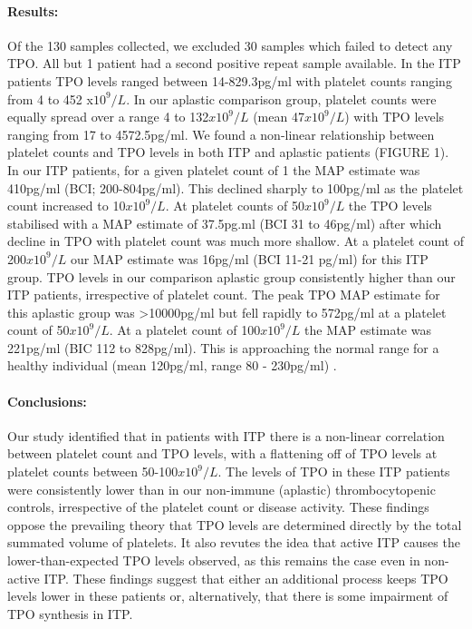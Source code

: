 \documentclass[11pt]{article}
\begin{document}
\paragraph{Results:} Of the 130 samples collected, we excluded 30 samples which failed to detect any TPO. All but 1 patient had a second positive repeat sample available. In the ITP patients TPO levels ranged between 14-829.3pg/ml with platelet counts ranging from 4 to 452 x$10^9/L$. In our aplastic comparison group, platelet counts were equally spread over a range 4 to 132$x10^9/L$ (mean 47$x10^9/L$) with TPO levels ranging from 17 to 4572.5pg/ml. We found a non-linear relationship between platelet counts and TPO levels in both ITP and aplastic patients (FIGURE 1). In our ITP patients, for a given platelet count of 1 the MAP estimate was 410pg/ml (BCI; 200-804pg/ml). This declined sharply to 100pg/ml as the platelet count increased to 10$x10^9/L$. At platelet counts of 50$x10^9/L$ the TPO levels stabilised with a MAP estimate of 37.5pg.ml (BCI 31 to 46pg/ml) after which decline in TPO with platelet count was much more shallow. At a platelet count of 200$x10^9/L$ our MAP estimate was 16pg/ml (BCI 11-21 pg/ml) for this ITP group. TPO levels in our comparison aplastic group consistently higher than our ITP patients, irrespective of platelet count. The peak TPO MAP estimate for this aplastic group was >10000pg/ml but fell rapidly to 572pg/ml at a platelet count of 50$x10^9/L$. At a platelet count of 100$x10^9/L$ the MAP estimate was 221pg/ml (BIC 112 to 828pg/ml). This is approaching the normal range for a healthy individual (mean 120pg/ml, range 80 - 230pg/ml) \cite{SinghCirculatingthrombopoietinlevels2015}.

\paragraph{Conclusions:} Our study identified that in patients with ITP there is a non-linear correlation between platelet count and TPO levels, with a flattening off of TPO levels at platelet counts between 50-100$x10^9/L$. The levels of TPO in these ITP patients were consistently lower than in our non-immune (aplastic) thrombocytopenic controls, irrespective of the platelet count or disease activity. These findings oppose the prevailing theory that TPO levels are determined directly by the total summated volume of platelets. It also revutes the idea that active ITP causes the lower-than-expected TPO levels observed, as this remains the case even in non-active ITP. These findings suggest that either an additional process keeps TPO levels lower in these patients or, alternatively, that there is some impairment of TPO synthesis in ITP.
\end{document}
